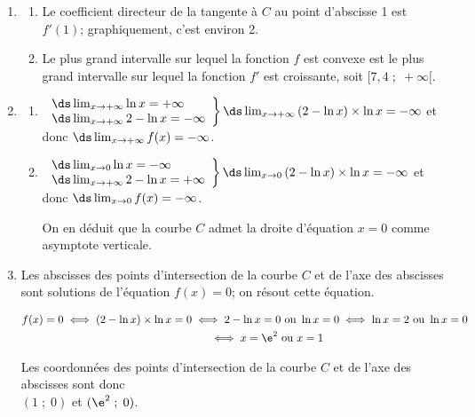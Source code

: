 \begin{enumerate}
	\item

	\begin{enumerate}
		\item Le coefficient directeur de la tangente à $C$ au point d'abscisse 1 est $f'(1)$; graphiquement, c'est environ 2.

		\item 	Le plus grand intervalle sur lequel la fonction $f$ est convexe est le plus grand intervalle sur lequel la fonction $f'$ est croissante, soit  $[7,4\;;\;+\infty[$.
	\end{enumerate}

	\item \begin{enumerate}
		\item 
$\left .\begin{array}{l}
\ds\lim _{x\to +\infty} \ln x = +\infty\\
\ds\lim _{x\to +\infty} 2-\ln x = -\infty
\end{array}		
\right \}
\ds\lim _{x\to +\infty} \left (2-\ln x\right )\times \ln x = -\infty$
et donc
$\ds\lim _{x\to +\infty} f(x) = -\infty$.

		\item
$\left .\begin{array}{l}
\ds\lim _{x\to 0} \ln x = -\infty\\
\ds\lim _{x\to +\infty} 2-\ln x = +\infty
\end{array}		
\right \}
\ds\lim _{x\to 0} \left (2-\ln x\right )\times \ln x = -\infty$
et donc
$\ds\lim _{x\to 0} f(x) = -\infty$.
		
On en déduit que la courbe $C$ admet la droite d'équation $x=0$ comme asymptote verticale.		
	\end{enumerate}

	\item 
Les abscisses des points d'intersection de la courbe $C$ et de l'axe des abscisses sont solutions de l'équation $f(x)=0$; on résout cette équation.

$\begin{gathered}f(x)=0
\iff
(2-\ln x)\times \ln x=0
\iff
2-\ln x = 0 \text{ ou }	\ln x = 0
\iff
\ln x = 2 \text{ ou } \ln x = 0\\
\phantom{f(x)=0}
\iff
x=\e^{2} \text{ ou } x=1\end{gathered}$

Les coordonnées des  points d'intersection de la courbe $C$ et de l'axe des abscisses sont donc \\$(1\;;\;0)$ et $(\e^{2}\;;\;0)$.


\end{enumerate}
